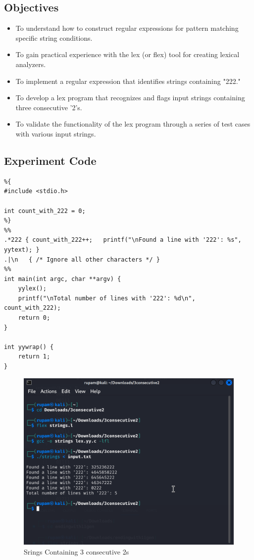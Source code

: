 \documentclass[12pt]{article}
\begin{document}
\subsection*{Objectives}
\begin{itemize}
    \item To understand how to construct regular expressions for pattern matching specific string conditions.
    \item To gain practical experience with the lex (or flex) tool for creating lexical analyzers.
    \item To implement a regular expression that identifies strings containing "222."
    \item To develop a lex program that recognizes and flags input strings containing three consecutive '2's.
    \item To validate the functionality of the lex program through a series of test cases with various input strings.
\end{itemize}

\subsection*{Experiment Code}
\begin{lstlisting}
%{
#include <stdio.h>

int count_with_222 = 0;
%}
%%
.*222 { count_with_222++;   printf("\nFound a line with '222': %s", yytext); }
.|\n   { /* Ignore all other characters */ }
%%
int main(int argc, char **argv) {
    yylex();
    printf("\nTotal number of lines with '222': %d\n", count_with_222);
    return 0;
}

int yywrap() {
    return 1;
}
\end{lstlisting}
\begin{figure}[H]
    \centering
    \includegraphics[width=1\linewidth]{exp4output.png}
    \caption{Srings Containing 3 consecutive 2s}
\end{figure}
\end{document}
